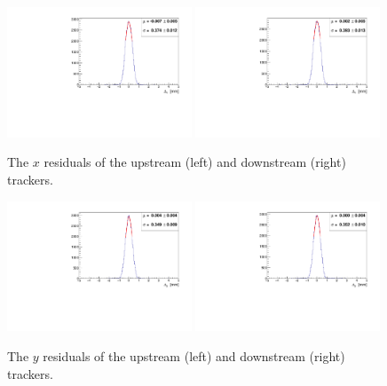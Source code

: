   \begin{figure}[p]
    \begin{center}
      \includegraphics[width=0.49\textwidth, angle=0]{08-Performance/upstream_x_residual.pdf}
      \includegraphics[width=0.49\textwidth, angle=0]{08-Performance/downstream_x_residual.pdf}
      \caption{\label{fig:XResidKalman} The $x$ residuals of the upstream (left) and downstream (right) trackers.}
    \end{center}
  \end{figure}
  
    \begin{figure}[p]
    \begin{center}
      \includegraphics[width=0.49\textwidth, angle=0]{08-Performance/upstream_y_residual.pdf}
      \includegraphics[width=0.49\textwidth, angle=0]{08-Performance/downstream_y_residual.pdf}
      \caption{\label{fig:YResidKalman} The $y$ residuals of the upstream (left) and downstream (right) trackers.}
    \end{center}
  \end{figure}
  
